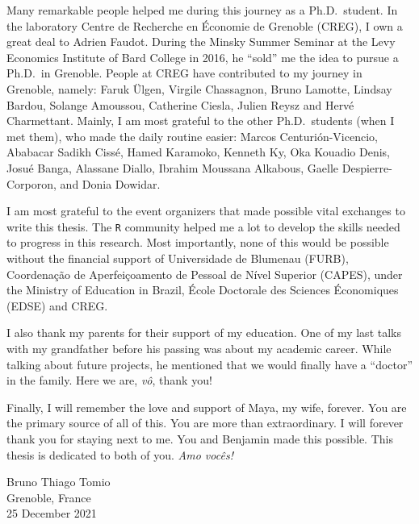\documentclass[a4paper, twoside]{templates/ociamthesis}
\begin{document}
\begin{romanpages}
\begin{acknowledgements}
  Many remarkable people helped me during this journey as a Ph.D.~student. In the laboratory Centre de Recherche en Économie de Grenoble (CREG), I own a great deal to Adrien Faudot. During the Minsky Summer Seminar at the Levy Economics Institute of Bard College in 2016, he ``sold'' me the idea to pursue a Ph.D.~in Grenoble. People at CREG have contributed to my journey in Grenoble, namely: Faruk Ülgen, Virgile Chassagnon, Bruno Lamotte, Lindsay Bardou, Solange Amoussou, Catherine Ciesla, Julien Reysz and Hervé Charmettant. Mainly, I am most grateful to the other Ph.D.~students (when I met them), who made the daily routine easier: Marcos Centurión-Vicencio, Ababacar Sadikh Cissé, Hamed Karamoko, Kenneth Ky, Oka Kouadio Denis, Josué Banga, Alassane Diallo, Ibrahim Moussana Alkabous, Gaelle Despierre-Corporon, and Donia Dowidar.

  I am most grateful to the event organizers that made possible vital exchanges to write this thesis. The \texttt{R} community helped me a lot to develop the skills needed to progress in this research. Most importantly, none of this would be possible without the financial support of Universidade de Blumenau (FURB), Coordenação de Aperfeiçoamento de Pessoal de Nível Superior (CAPES), under the Ministry of Education in Brazil, École Doctorale des Sciences Économiques (EDSE) and CREG.

  I also thank my parents for their support of my education. One of my last talks with my grandfather before his passing was about my academic career. While talking about future projects, he mentioned that we would finally have a ``doctor'' in the family. Here we are, \emph{vô}, thank you!

  Finally, I will remember the love and support of Maya, my wife, forever. You are the primary source of all of this. You are more than extraordinary. I will forever thank you for staying next to me. You and Benjamin made this possible. This thesis is dedicated to both of you. \emph{Amo vocês!}

  \begin{flushright}
  Bruno Thiago Tomio \\
  Grenoble, France \\
  25 December 2021
  \end{flushright}
\end{acknowledgements}



\end{romanpages}
\end{document}
